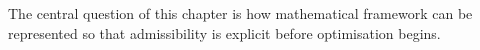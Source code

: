 The central question of this chapter is how mathematical framework can be represented so that admissibility is explicit before optimisation begins.
